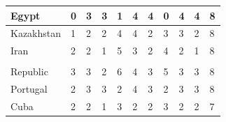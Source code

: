 \documentclass[12pt]{article}  %
\begin{document}
\begin{subappendices}
\begin{longtable}{|l|l|l|l|l|l|l|l|l|l|l|}
	\hline
	Egypt                                                          & 0                                                 & 3                                                 & 3                                                 & 1                                                 & 4                                                 & 4                                                 & 0    & 4      & 4      & 8      \\ 
	\hline
	Kazakhstan                                                     & 1                                                 & 2                                                 & 2                                                 & 4                                                 & 4                                                 & 2                                                 & 3    & 3      & 2      & 8      \\ 
	\hline
	Iran                                                           & 2                                                 & 2                                                 & 1                                                 & 5                                                 & 3                                                 & 2                                                 & 4    & 2      & 1      & 8      \\ 
	\hline
	\begin{tabular}[c]{@{}l@{}}Dominican \\Republic\end{tabular}   & 3                                                 & 3                                                 & 2                                                 & 6                                                 & 4                                                 & 3                                                 & 5    & 3      & 3      & 8      \\ 
	\hline
	Portugal                                                       & 2                                                 & 3                                                 & 3                                                 & 2                                                 & 4                                                 & 3                                                 & 2    & 3      & 3      & 8      \\ 
	\hline
	Cuba                                                           & 2                                                 & 2                                                 & 1                                                 & 3                                                 & 2                                                 & 2                                                 & 3    & 2      & 2      & 7      \\ 

\end{longtable}
\end{subappendices}
\end{document}
